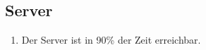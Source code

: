 \subsection{Server}

\begin{enumerate}
    \item Der Server ist in 90\% der Zeit erreichbar. 
\end{enumerate}